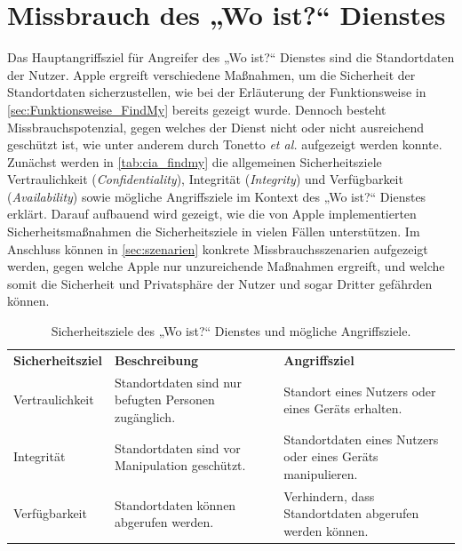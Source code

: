 \section{Missbrauch des „Wo ist?“ Dienstes}
\label{sec:Missbrauch}

Das Hauptangriffsziel für Angreifer des „Wo ist?“ Dienstes sind die Standortdaten der Nutzer.
Apple ergreift verschiedene Maßnahmen, um die Sicherheit der Standortdaten sicherzustellen, wie bei der Erläuterung der Funktionsweise in \autoref{sec:Funktionsweise_FindMy} bereits gezeigt wurde.
Dennoch besteht Missbrauchspotenzial, gegen welches der Dienst nicht oder nicht ausreichend geschützt ist, wie unter anderem durch Tonetto \textit{et al.} \cite{Tonetto_FindMy} aufgezeigt werden konnte.
Zunächst werden in \autoref{tab:cia_findmy} die allgemeinen Sicherheitsziele Vertraulichkeit (\textit{Confidentiality}), Integrität (\textit{Integrity}) und Verfügbarkeit (\textit{Availability}) sowie mögliche Angriffsziele im Kontext des „Wo ist?“ Dienstes erklärt.
Darauf aufbauend wird gezeigt, wie die von Apple implementierten Sicherheitsmaßnahmen die Sicherheitsziele in vielen Fällen unterstützen.
Im Anschluss können in \autoref{sec:szenarien} konkrete Missbrauchsszenarien aufgezeigt werden, gegen welche Apple nur unzureichende Maßnahmen ergreift, und welche somit die Sicherheit und Privatsphäre der Nutzer und sogar Dritter gefährden können.

\begin{table}[h]
  \caption{Sicherheitsziele des „Wo ist?“ Dienstes und mögliche Angriffsziele.}
  \label{tab:cia_fincmy}
  \begin{tabularx}{\textwidth}{ |l|X|X| }
    \hline
    \textbf{Sicherheitsziel}  & \textbf{Beschreibung}                                               & \textbf{Angriffsziel}                                           \\
    \Xhline{0.5mm}
    \hline
    Vertraulichkeit           & Standortdaten sind nur befugten Personen zugänglich.                & Standort eines Nutzers oder eines Geräts erhalten.              \\
    \hline
    Integrität                & Standortdaten sind vor Manipulation geschützt.                      & Standortdaten eines Nutzers oder eines Geräts manipulieren.     \\
    \hline
    Verfügbarkeit             & Standortdaten können abgerufen werden.                              & Verhindern, dass Standortdaten abgerufen werden können.         \\
    \hline
  \end{tabularx}
\end{table}

